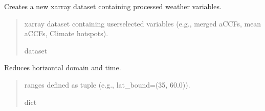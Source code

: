 \documentclass[a4paper,11pt,english]{sphinxmanual}
\begin{document}
\begin{fulllineitems}
\begin{fulllineitems}
\begin{quote}
\begin{description}
\begin{itemize}
\end{itemize}

\end{description}\end{quote}

\end{fulllineitems}


\begin{fulllineitems}
\label{\detokenize{modules:climaccf.weather_store.WeatherStore.get_xarray}}
\pysigstartsignatures
{}
\pysigstopsignatures
\sphinxAtStartPar
Creates a new xarray dataset containing processed weather variables.
\begin{quote}\begin{description}
\sphinxAtStartPar
xarray dataset containing user\sphinxhyphen{}selected variables (e.g., merged aCCFs, mean aCCFs, Climate hotspots).

\sphinxAtStartPar
dataset

\end{description}\end{quote}

\end{fulllineitems}


\begin{fulllineitems}
\label{\detokenize{modules:climaccf.weather_store.WeatherStore.reduce_domain}}
\pysigstartsignatures
{}
\pysigstopsignatures
\sphinxAtStartPar
Reduces horizontal domain and time.
\begin{quote}\begin{description}
\sphinxAtStartPar
{} \textendash{} ranges defined as tuple (e.g., lat\_bound=(35, 60.0)).

\sphinxAtStartPar
dict

\end{description}\end{quote}

\end{fulllineitems}


\end{fulllineitems}
\end{document}
